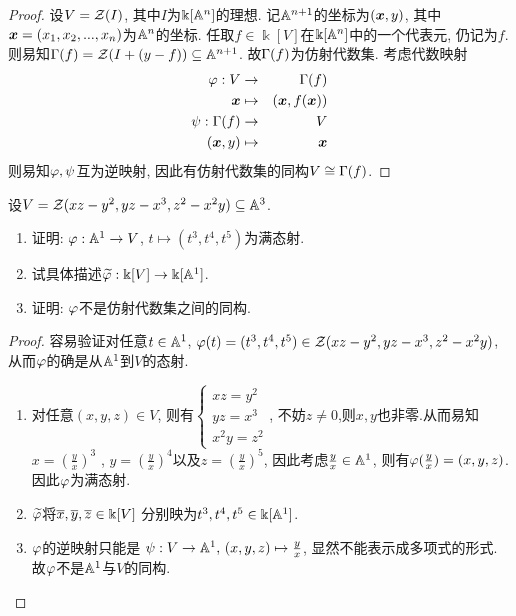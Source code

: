 \documentclass[oneside,a4papar,11pt,UTF8]{book}
\begin{document}
\begin{enumerate}
  \begin{proof}
    设$V=\mathcal{Z}(I)$,
    其中$I$为$\Bbbk[\mathbb{A}^n]$的理想.
    记$\mathbb{A}^{n+1}$的坐标为$(\boldsymbol{x},y)$,
    其中$\boldsymbol{x}=(x_1,x_2,...,x_n)$为$\mathbb{A}^n$的坐标.
    任取$f\in\Bbbk[V]$在$\Bbbk[\mathbb{A}^n]$中的一个代表元,
    仍记为$f$.
    则易知$\Gamma(f)=\mathcal{Z}(I+(y-f))\subseteq\mathbb{A}^{n+1}$.
    故$\Gamma(f)$为仿射代数集.
    考虑代数映射
    \begin{eqnarray*}
      \varphi: V&\to&\Gamma(f)\\
      \boldsymbol{x}&\mapsto&(\boldsymbol{x},f(\boldsymbol{x}))\\
      \psi:\Gamma(f)&\to& V\\
      (\boldsymbol{x},y)&\mapsto&\boldsymbol{x}
    \end{eqnarray*}
  则易知$\varphi,\psi$互为逆映射,
  因此有仿射代数集的同构$V\cong\Gamma(f)$.
  \end{proof}

  \begin{prob}\label{ex-15-1-26}
    设$V=\mathcal{Z}(xz-y^2,yz-x^3,z^2-x^2y)\subseteq\mathbb{A}^3$.
    \begin{enumerate}
      \item 证明: $\varphi:\mathbb{A}^1\to V$, $t\mapsto(t^3,t^4,t^5)$为满态射.
      \item 试具体描述$\widetilde{\varphi}:\Bbbk[V]\to\Bbbk[\mathbb{A}^1]$.
      \item 证明: $\varphi$不是仿射代数集之间的同构.
    \end{enumerate}
  \end{prob}

  \begin{proof}
    容易验证对任意$t\in\mathbb{A}^1$,
    $\varphi(t)=(t^3,t^4,t^5)\in\mathcal{Z}(xz-y^2,yz-x^3,z^2-x^2y)$,
    从而$\varphi$的确是从$\mathbb{A}^1$到$V$的态射.

    \begin{enumerate}
      \item 对任意$(x,y,z)\in V$,
      则有$
      \begin{cases}
        xz=y^2\\
        yz=x^3\\
        x^2y=z^2
      \end{cases}
      $,
      不妨$z\neq 0$,则$x,y$也非零.从而易知$x=(\frac yx)^3$
      , $y=(\frac yx)^4$以及$z=(\frac yx)^5$,
      因此考虑$\frac yx\in\mathbb{A}^1$,
      则有$\varphi(\frac yx)=(x,y,z)$.
      因此$\varphi$为满态射.
      \item $\widetilde{\varphi}$将$\overline{x},\overline{y},\overline{z}\in\Bbbk[V]$
      分别映为$t^3,t^4,t^5\in\Bbbk[\mathbb{A}^1]$.
      \item $\varphi$的逆映射只能是
      $\psi:V\to\mathbb{A}^1,\,(x,y,z)\mapsto\frac yx$,
      显然不能表示成多项式的形式.
      故$\varphi$不是$\mathbb{A}^1$与$V$的同构.
    \end{enumerate}
  \end{proof}


\end{enumerate}
\end{document}
